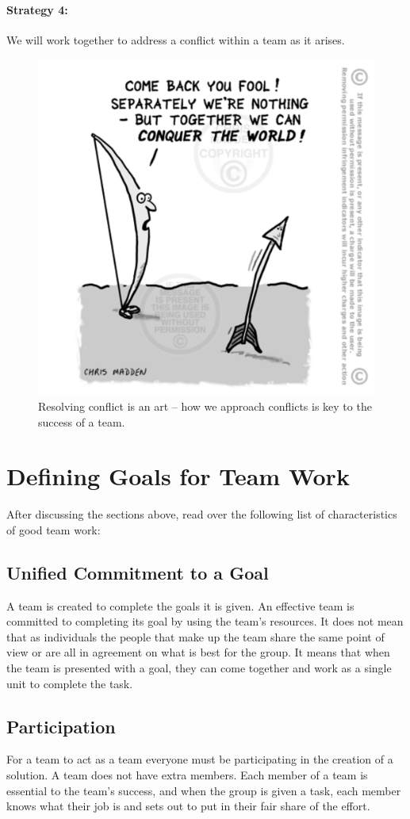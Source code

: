 \documentclass{article}\usepackage[]{graphicx}\usepackage[]{color}
\begin{document}
\paragraph{Strategy 4:} We will work together to address a conflict within a team as it arises. 

\begin{figure}
\includegraphics[width=.50\textwidth]{../graphics/Bow-arrow-conquer-world}
\caption{Resolving conflict is an art -- how we approach conflicts is key to the success of a team.}
\end{figure}

\section{Defining Goals for Team Work} 

After discussing the sections above, read over the following list of characteristics of good team work: 

\subsection{Unified Commitment to a Goal}
A team is created to complete the goals it is given. An effective team is committed to completing its goal by using the team's resources. It does not mean that as individuals the people that make up the team share the same point of view or are all in agreement on what is best for the group. It means that when the team is presented with a goal, they can come together and work as a single unit to complete the task.

\subsection{Participation}
For a team to act as a team everyone must be participating in the creation of a solution. A team does not have extra members. Each member of a team is essential to the team's success, and when the group is given a task, each member knows what their job is and sets out to put in their fair share of the effort.
\end{document}

